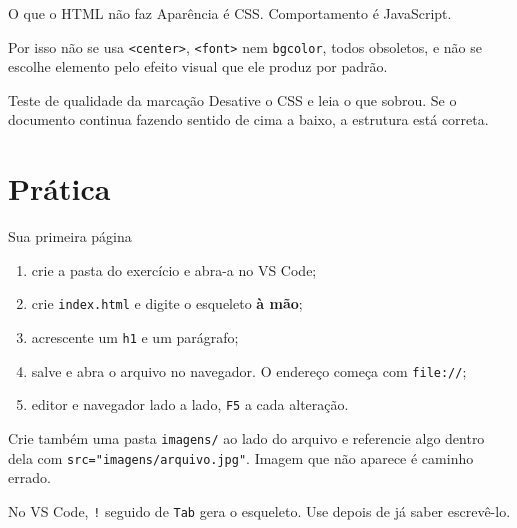 \documentclass{beamer}
\begin{document}
\begin{frame}{O que o HTML não faz}
  Aparência é CSS. Comportamento é JavaScript.

  \vspace{0.4cm}
  Por isso não se usa \texttt{<center>}, \texttt{<font>} nem \texttt{bgcolor},
  todos obsoletos, e não se escolhe elemento pelo efeito visual que ele produz
  por padrão.

  \vspace{0.5cm}
  \begin{block}{Teste de qualidade da marcação}
    Desative o CSS e leia o que sobrou. Se o documento continua fazendo sentido
    de cima a baixo, a estrutura está correta.
  \end{block}
\end{frame}

\section{Prática}

\begin{frame}{Sua primeira página}
  \begin{enumerate}
    \item crie a pasta do exercício e abra-a no VS Code;
    \item crie \texttt{index.html} e digite o esqueleto \textbf{à mão};
    \item acrescente um \texttt{h1} e um parágrafo;
    \item salve e abra o arquivo no navegador. O endereço começa com
          \texttt{file://};
    \item editor e navegador lado a lado, \texttt{F5} a cada alteração.
  \end{enumerate}

  \vspace{0.3cm}
  Crie também uma pasta \texttt{imagens/} ao lado do arquivo e referencie algo
  dentro dela com \texttt{src="imagens/arquivo.jpg"}. Imagem que não aparece é
  caminho errado.

  \vspace{0.3cm}
  \small No VS Code, \texttt{!} seguido de \texttt{Tab} gera o esqueleto. Use
  depois de já saber escrevê-lo.
\end{frame}
\end{document}
